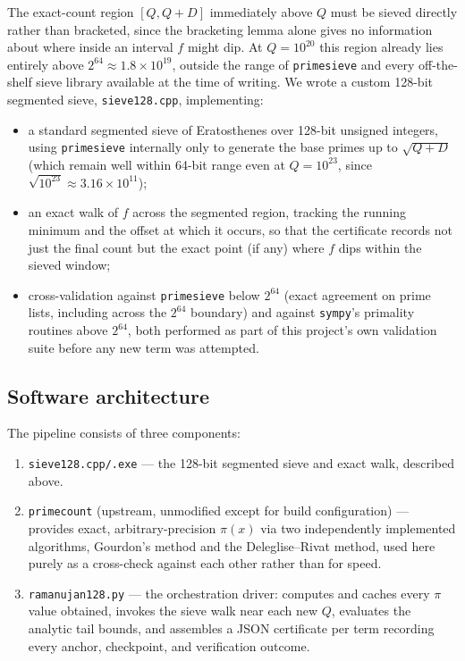 \documentclass[11pt]{amsart}
\newcommand{\pcount}{\pi}
\begin{document}
The exact-count region $[Q, Q+D]$ immediately above $Q$ must be sieved
directly rather than bracketed, since the bracketing lemma alone gives no
information about where inside an interval $f$ might dip. At
$Q=10^{20}$ this region already lies entirely above $2^{64} \approx
1.8\times10^{19}$, outside the range of \texttt{primesieve} and every
off-the-shelf sieve library available at the time of writing. We wrote a
custom 128-bit segmented sieve, \texttt{sieve128.cpp}, implementing:

\begin{itemize}
  \item a standard segmented sieve of Eratosthenes over 128-bit unsigned
  integers, using \texttt{primesieve} internally only to generate the
  base primes up to $\sqrt{Q+D}$ (which remain well within 64-bit range
  even at $Q=10^{23}$, since $\sqrt{10^{23}} \approx 3.16\times10^{11}$);
  \item an exact walk of $f$ across the segmented region, tracking the
  running minimum and the offset at which it occurs, so that the
  certificate records not just the final count but the exact point (if
  any) where $f$ dips within the sieved window;
  \item cross-validation against \texttt{primesieve} below $2^{64}$
  (exact agreement on prime lists, including across the $2^{64}$
  boundary) and against \texttt{sympy}'s primality routines above
  $2^{64}$, both performed as part of this project's own validation
  suite before any new term was attempted.
\end{itemize}

\subsection{Software architecture}

The pipeline consists of three components:

\begin{enumerate}
  \item \texttt{sieve128.cpp/.exe} --- the 128-bit segmented sieve and
  exact walk, described above.
  \item \texttt{primecount} (upstream, unmodified except for build
  configuration) --- provides exact, arbitrary-precision $\pcount(x)$ via
  two independently implemented algorithms, Gourdon's method and the
  Deleglise--Rivat method, used here purely as a cross-check against each
  other rather than for speed.
  \item \texttt{ramanujan128.py} --- the orchestration driver: computes
  and caches every $\pcount$ value obtained, invokes the sieve walk near
  each new $Q$, evaluates the analytic tail bounds, and assembles a
  JSON certificate per term recording every anchor, checkpoint, and
  verification outcome.
\end{enumerate}
\end{document}
